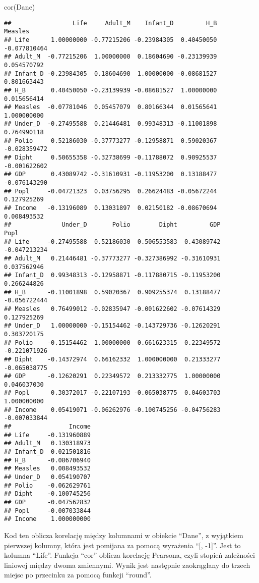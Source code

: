 \documentclass[
]{article}
\newenvironment{Shaded}{\begin{snugshade}}{\end{snugshade}}
\newcommand{\FunctionTok}[1]{\textcolor[rgb]{0.00,0.00,0.00}{#1}}
\newcommand{\NormalTok}[1]{#1}
\begin{document}
\begin{Shaded}
\begin{Highlighting}[]
\FunctionTok{cor}\NormalTok{(Dane)}
\end{Highlighting}
\end{Shaded}

\begin{verbatim}
##                 Life     Adult_M    Infant_D         H_B      Measles
## Life      1.00000000 -0.77215206 -0.23984305  0.40450050 -0.077810464
## Adult_M  -0.77215206  1.00000000  0.18604690 -0.23139939  0.054570792
## Infant_D -0.23984305  0.18604690  1.00000000 -0.08681527  0.801663443
## H_B       0.40450050 -0.23139939 -0.08681527  1.00000000  0.015656414
## Measles  -0.07781046  0.05457079  0.80166344  0.01565641  1.000000000
## Under_D  -0.27495588  0.21446481  0.99348313 -0.11001898  0.764990118
## Polio     0.52186030 -0.37773277 -0.12958871  0.59020367 -0.028359472
## Dipht     0.50655358 -0.32738699 -0.11788072  0.90925537 -0.001622602
## GDP       0.43089742 -0.31610931 -0.11953200  0.13188477 -0.076143290
## Popl     -0.04721323  0.03756295  0.26624483 -0.05672244  0.127925269
## Income   -0.13196089  0.13031897  0.02150182 -0.08670694  0.008493532
##              Under_D       Polio        Dipht         GDP         Popl
## Life     -0.27495588  0.52186030  0.506553583  0.43089742 -0.047213234
## Adult_M   0.21446481 -0.37773277 -0.327386992 -0.31610931  0.037562946
## Infant_D  0.99348313 -0.12958871 -0.117880715 -0.11953200  0.266244826
## H_B      -0.11001898  0.59020367  0.909255374  0.13188477 -0.056722444
## Measles   0.76499012 -0.02835947 -0.001622602 -0.07614329  0.127925269
## Under_D   1.00000000 -0.15154462 -0.143729736 -0.12620291  0.303720175
## Polio    -0.15154462  1.00000000  0.661623315  0.22349572 -0.221071926
## Dipht    -0.14372974  0.66162332  1.000000000  0.21333277 -0.065038775
## GDP      -0.12620291  0.22349572  0.213332775  1.00000000  0.046037030
## Popl      0.30372017 -0.22107193 -0.065038775  0.04603703  1.000000000
## Income    0.05419071 -0.06262976 -0.100745256 -0.04756283 -0.007033844
##                Income
## Life     -0.131960889
## Adult_M   0.130318973
## Infant_D  0.021501816
## H_B      -0.086706940
## Measles   0.008493532
## Under_D   0.054190707
## Polio    -0.062629761
## Dipht    -0.100745256
## GDP      -0.047562832
## Popl     -0.007033844
## Income    1.000000000
\end{verbatim}

Kod ten oblicza korelację między kolumnami w obiekcie ``Dane'', z
wyjątkiem pierwszej kolumny, która jest pomijana za pomocą wyrażenia
``{[}, -1{]}''. Jest to kolumna ``Life''. Funkcja ``cor'' oblicza
korelację Pearsona, czyli stopień zależności liniowej między dwoma
zmiennymi. Wynik jest następnie zaokrąglany do trzech miejsc po
przecinku za pomocą funkcji ``round''.
\end{document}
